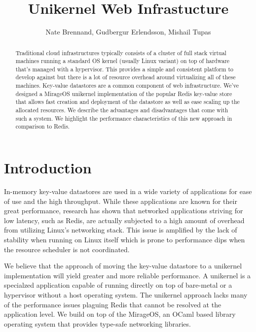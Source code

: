 \documentclass[english,10pt,twocolumn]{article}
\begin{document}
\title{Unikernel Web Infrastucture}
\author{Nate Brennand, Gudbergur Erlendsson, Mishail Tupas}
\date{}
\maketitle
\thispagestyle{empty}

\begin{abstract}
  Traditional cloud infrastructures typically consists of a cluster of full stack virtual machines running a standard OS kernel (usually Linux variant) on top of hardware that's managed with a hypervisor. This provides a simple and consistent platform to develop against but there is a lot of resource overhead around virtualizing all of these machines.
  Key-value datastores are a common component of web infrastructure.
  We've designed a MirageOS\cite{mirage} unikernel implementation of the popular Redis\cite{redis} key-value store that allows fast creation and deployment of the datastore as well as ease scaling up the allocated resources.
  We describe the advantages and disadvantages that come with such a system.
  We highlight the performance characteristics of this new approach in comparison to Redis.
\end{abstract}

\section{Introduction}
  In-memory key-value datastores are used in a wide variety of applications for ease of use and the high throughput.
  While these applications are known for their great performance, research has shown that networked applications striving for low latency, such as Redis, are actually subjected to a high amount of overhead from utilizing Linux's networking stack.\cite{arrakis}
  This issue is amplified by the lack of stability when running on Linux itself which is prone to performance dips when the resource scheduler is not coordinated.

  We believe that the approach of moving the key-value datastore to a unikernel implementation will yield greater and more reliable performance.
  A unikernel is a specialzed application capable of running directly on top of bare-metal or a hypervisor without a host operating system.
  The unikernel approach lacks many of the performance issues plaguing Redis that cannot be resolved at the application level.
  We build on top of the MirageOS\cite{mirage}, an OCaml based library operating system that provides type-safe networking libraries.
\end{document}
